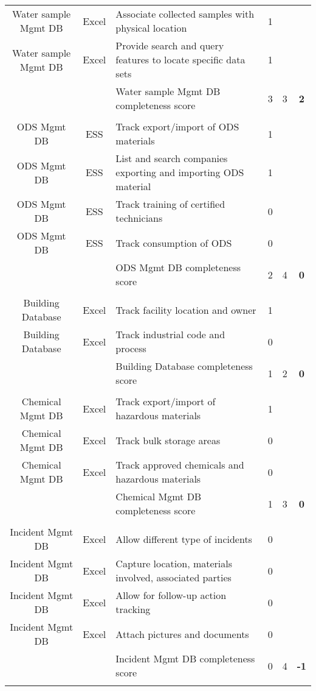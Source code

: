 \begin{table}[H]
{\begin{tabular}{@{}cclccc@{}}
Water sample Mgmt DB & Excel & Associate collected samples with physical location & 1 &  &  \\
Water sample Mgmt DB & Excel & Provide search and query features to locate specific data sets & 1 &  &  \\
 &  & Water sample Mgmt DB completeness score & 3 & 3 & \textbf{2} \\
 &  &  &  &  &  \\
ODS Mgmt DB & ESS & Track export/import of ODS materials & 1 &  &  \\
ODS Mgmt DB & ESS & List and search companies exporting and importing ODS material & 1 &  &  \\
ODS Mgmt DB & ESS & Track training of certified technicians & 0 &  &  \\
ODS Mgmt DB & ESS & Track consumption of ODS & 0 &  &  \\
 &  & ODS Mgmt DB completeness score & 2 & 4 & \textbf{0} \\
 &  &  &  &  &  \\
Building Database & Excel & Track facility location and owner & 1 &  &  \\
Building Database & Excel & Track industrial code and process & 0 &  &  \\
 &  & Building Database completeness score & 1 & 2 & \textbf{0} \\
 &  &  &  &  &  \\
Chemical Mgmt DB & Excel & Track export/import of hazardous materials & 1 &  &  \\
Chemical Mgmt DB & Excel & Track bulk storage areas & 0 &  &  \\
Chemical Mgmt DB & Excel & Track approved chemicals and hazardous materials & 0 &  &  \\
 &  & Chemical Mgmt DB completeness score & 1 & 3 & \textbf{0} \\
 &  &  &  &  &  \\
Incident Mgmt DB & Excel & Allow different type of incidents & 0 &  &  \\
Incident Mgmt DB & Excel & Capture location, materials involved, associated parties & 0 &  &  \\
Incident Mgmt DB & Excel & Allow for follow-up action tracking & 0 &  &  \\
Incident Mgmt DB & Excel & Attach pictures and documents & 0 &  &  \\
 &  & Incident Mgmt DB completeness score & 0 & 4 & \textbf{-1} \\
 &  &  &  &  &  \\

\end{tabular}}
\end{table}
